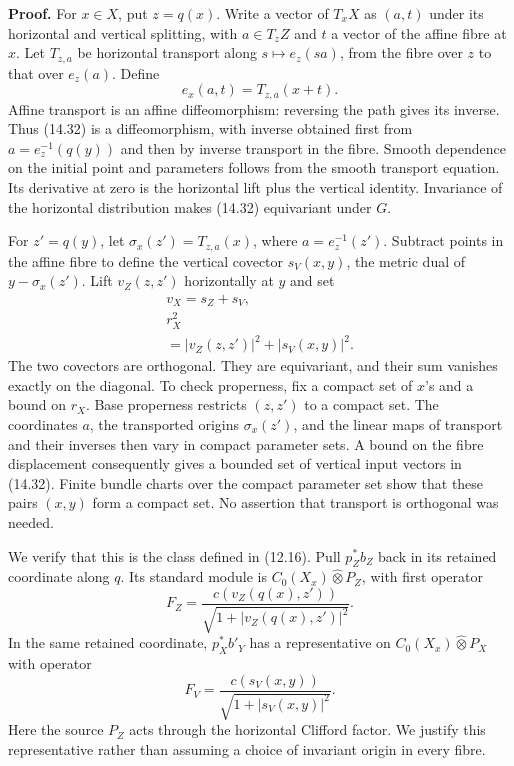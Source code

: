 \documentclass[
  11pt,
]{article}
\begin{document}
\textbf{Proof.} For \(x\in X\), put \(z=q(x)\). Write a vector of
\(T_xX\) as \((a,t)\) under its horizontal and vertical splitting, with
\(a\in T_zZ\) and \(t\) a vector of the affine fibre at \(x\). Let
\(T_{z,a}\) be horizontal transport along \(s\mapsto e_z(sa)\), from the
fibre over \(z\) to that over \(e_z(a)\). Define \[
e_x(a,t)=T_{z,a}(x+t).
\tag{14.32}
\] Affine transport is an affine diffeomorphism: reversing the path
gives its inverse. Thus (14.32) is a diffeomorphism, with inverse
obtained first from \(a=e_z^{-1}(q(y))\) and then by inverse transport
in the fibre. Smooth dependence on the initial point and parameters
follows from the smooth transport equation. Its derivative at zero is
the horizontal lift plus the vertical identity. Invariance of the
horizontal distribution makes (14.32) equivariant under \(G\).

For \(z'=q(y)\), let \(\sigma_x(z')=T_{z,a}(x)\), where
\(a=e_z^{-1}(z')\). Subtract points in the affine fibre to define the
vertical covector \(s_V(x,y)\), the metric dual of \(y-\sigma_x(z')\).
Lift \(v_Z(z,z')\) horizontally at \(y\) and set \[
\begin{gathered}
v_X=s_Z+s_V,\\
r_X^2\\
=|v_Z(z,z')|^2+|s_V(x,y)|^2.
\end{gathered}
\tag{14.33}
\] The two covectors are orthogonal. They are equivariant, and their sum
vanishes exactly on the diagonal. To check properness, fix a compact set
of \(x\)'s and a bound on \(r_X\). Base properness restricts \((z,z')\)
to a compact set. The coordinates \(a\), the transported origins
\(\sigma_x(z')\), and the linear maps of transport and their inverses
then vary in compact parameter sets. A bound on the fibre displacement
consequently gives a bounded set of vertical input vectors in (14.32).
Finite bundle charts over the compact parameter set show that these
pairs \((x,y)\) form a compact set. No assertion that transport is
orthogonal was needed.

We verify that this is the class defined in (12.16). Pull \(p_Z^*b_Z\)
back in its retained coordinate along \(q\). Its standard module is
\(C_0(X_x)\widehat\otimes P_Z\), with first operator \[
F_Z=\frac{c(v_Z(q(x),z'))}{\sqrt{1+|v_Z(q(x),z')|^2}}.
\tag{14.34}
\] In the same retained coordinate, \(p_X^*b'_Y\) has a representative
on \(C_0(X_x)\widehat\otimes P_X\) with operator \[
F_V=\frac{c(s_V(x,y))}{\sqrt{1+|s_V(x,y)|^2}}.
\tag{14.35}
\] Here the source \(P_Z\) acts through the horizontal Clifford factor.
We justify this representative rather than assuming a choice of
invariant origin in every fibre.
\end{document}
